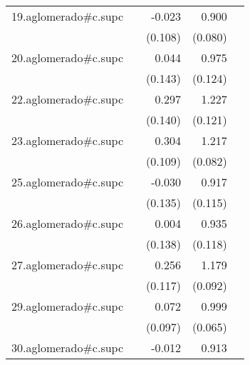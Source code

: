 {\begin{longtable}{l*{4}{D{.}{.}{-1}}}
\addlinespace
19.aglomerado#c.supc&                     &      -0.023         &       0.900\sym{***}&                     \\
            &                     &     (0.108)         &     (0.080)         &                     \\
\addlinespace
20.aglomerado#c.supc&                     &       0.044         &       0.975\sym{***}&                     \\
            &                     &     (0.143)         &     (0.124)         &                     \\
\addlinespace
22.aglomerado#c.supc&                     &       0.297\sym{*}  &       1.227\sym{***}&                     \\
            &                     &     (0.140)         &     (0.121)         &                     \\
\addlinespace
23.aglomerado#c.supc&                     &       0.304\sym{**} &       1.217\sym{***}&                     \\
            &                     &     (0.109)         &     (0.082)         &                     \\
\addlinespace
25.aglomerado#c.supc&                     &      -0.030         &       0.917\sym{***}&                     \\
            &                     &     (0.135)         &     (0.115)         &                     \\
\addlinespace
26.aglomerado#c.supc&                     &       0.004         &       0.935\sym{***}&                     \\
            &                     &     (0.138)         &     (0.118)         &                     \\
\addlinespace
27.aglomerado#c.supc&                     &       0.256\sym{*}  &       1.179\sym{***}&                     \\
            &                     &     (0.117)         &     (0.092)         &                     \\
\addlinespace
29.aglomerado#c.supc&                     &       0.072         &       0.999\sym{***}&                     \\
            &                     &     (0.097)         &     (0.065)         &                     \\
\addlinespace
30.aglomerado#c.supc&                     &      -0.012         &       0.913\sym{***}&                     \\

\end{longtable}}
